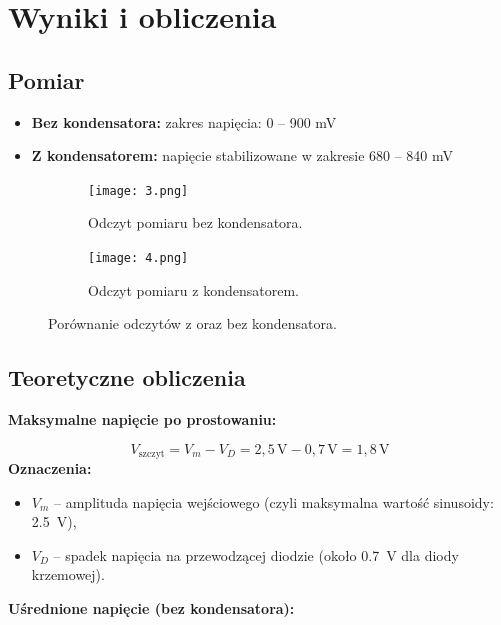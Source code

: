 \documentclass[a4paper,12pt]{article}
\begin{document}
\section*{Wyniki i obliczenia}

\subsection*{Pomiar}


\begin{itemize}
    \item \textbf{Bez kondensatora:} zakres napięcia: 0 -- 900 mV
    \item \textbf{Z kondensatorem:} napięcie stabilizowane w zakresie 680 -- 840 mV
\end{itemize}
\begin{figure}[h]
    \centering
    \begin{subfigure}{0.45\textwidth}
        \centering
        \texttt{[image: 3.png]}
        \caption{Odczyt pomiaru bez kondensatora.}
        \label{fig:schemat1}
    \end{subfigure}
    \hfill
    \begin{subfigure}{0.45\textwidth}
        \centering
        \texttt{[image: 4.png]}
        \caption{Odczyt pomiaru z kondensatorem.}
        \label{fig:schemat2}
    \end{subfigure}
    \caption{Porównanie odczytów z oraz bez kondensatora.}
    \label{fig:porownanie}
\end{figure}

\subsection*{Teoretyczne obliczenia}

\textbf{Maksymalne napięcie po prostowaniu:}

\[
V_{\text{szczyt}} = V_m - V_D = 2{,}5\,\text{V} - 0{,}7\,\text{V} = 1{,}8\,\text{V}
\]
\textbf{Oznaczenia:}

\begin{itemize}
    \item $V_m$ – amplituda napięcia wejściowego (czyli maksymalna wartość sinusoidy: \SI{2.5}{\volt}),
    \item $V_D$ – spadek napięcia na przewodzącej diodzie (około \SI{0.7}{\volt} dla diody krzemowej).
\end{itemize}

\textbf{Uśrednione napięcie (bez kondensatora):}
\end{document}
